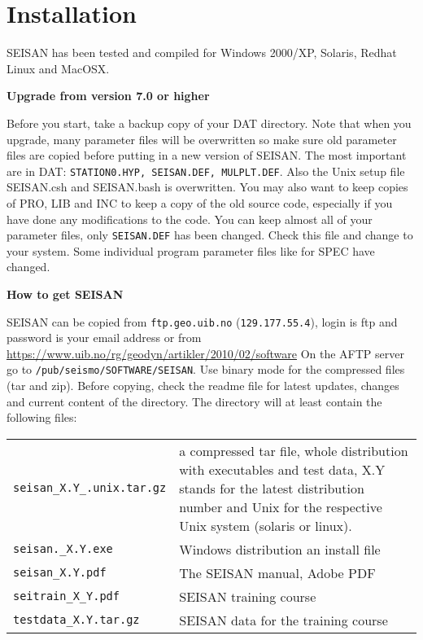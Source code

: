 

\chapter{Installation}
\label{chap:installation}

SEISAN has been tested and compiled for Windows 2000/XP, 
Solaris, Redhat Linux and MacOSX.

\textbf{Upgrade from version 7.0 or higher}

Before you start, take a backup copy of your DAT directory. Note that 
when you upgrade, many parameter files will be overwritten so make 
sure old parameter files are copied before putting in a new version 
of SEISAN. The most important are in DAT: 
\texttt{STATION0.HYP, SEISAN.DEF, MULPLT.DEF}. 
Also the Unix setup file 
SEISAN.csh and SEISAN.bash is overwritten. 
You may also want 
to keep copies of PRO, LIB and INC to keep a copy of the old source 
code, especially if you have done any modifications to the code. 
You can keep almost all of your parameter files, only \texttt{SEISAN.DEF} 
has been changed. Check this file and change to your system. Some individual program parameter files like for SPEC have changed. 

\textbf{How to get SEISAN}

SEISAN can be copied from \texttt{ftp.geo.uib.no} (\texttt{129.177.55.4}), 
login is ftp and password is your email address or from 
\url{https://www.uib.no/rg/geodyn/artikler/2010/02/software}
On the 
AFTP server go to \texttt{/pub/seismo/SOFTWARE/SEISAN}. Use binary 
mode for the compressed files (tar and zip). Before copying, check 
the readme file for latest updates, changes and current content of 
the directory. The directory will at least contain the following files: 

\begin{tabular}{|lp{10cm}|}
\hline
\texttt{seisan\_X.Y\_.unix.tar.gz} & a compressed tar file, whole 
distribution with executables and test data, X.Y 
stands for the latest distribution number and Unix for the respective Unix 
system (solaris or linux). \\
\texttt{seisan.\_X.Y.exe}  & Windows distribution an install file \\
\texttt{seisan\_X.Y.pdf}  & The SEISAN manual, Adobe PDF \\
\texttt{seitrain\_X\_Y.pdf} & SEISAN training course \\
\texttt{testdata\_X.Y.tar.gz} & SEISAN data for the training course\\
\hline
\end{tabular}
\newline

